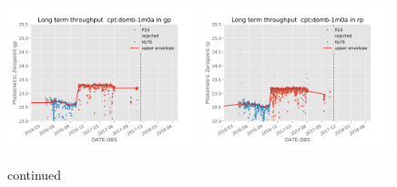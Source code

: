 \documentclass[]{spieman}
\begin{document}
\begin{figure}
\includegraphics[width=0.49\textwidth]{images/photzptrend-cpt-domb-1m0a-gp.png} \hspace*{\fill} 
\includegraphics[width=0.49\textwidth]{images/photzptrend-cpt-domb-1m0a-rp.png} \\[1ex]
\caption {continued}
\end{figure}
\end{document}
